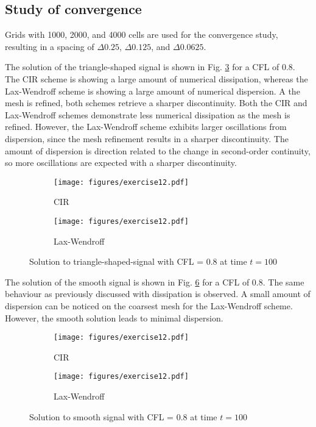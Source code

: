\documentclass[letterpaper,12pt,]{article}
\begin{document}
\subsection{Study of convergence}

Grids with 1000, 2000, and 4000 cells are used for the convergence study, resulting in a spacing of $\Delta 0.25$, $\Delta 0.125$, and $\Delta 0.0625$.

The solution of the triangle-shaped signal is shown in Fig. \ref{fig:e121} for a CFL of 0.8.
The CIR scheme is showing a large amount of numerical dissipation, whereas the Lax-Wendroff scheme is showing a large amount of numerical dispersion.
A the mesh is refined, both schemes retrieve a sharper discontinuity.
Both the CIR and Lax-Wendroff schemes demonstrate less numerical dissipation as the mesh is refined.
However, the Lax-Wendroff scheme exhibits larger oscillations from dispersion, since the mesh refinement results in a sharper discontinuity.
The amount of dispersion is direction related to the change in second-order continuity, so more oscillations are expected with a sharper discontinuity.

\begin{figure}[htb]%
  \centering%
  \begin{subfigure}[b]{0.49\textwidth}
    \texttt{[image: figures/exercise12.pdf]}
    \caption{CIR}
    \label{fig:cirt}
  \end{subfigure}
  \begin{subfigure}[b]{0.49\textwidth}
    \texttt{[image: figures/exercise12.pdf]}
    \caption{Lax-Wendroff}
    \label{fig:lwt}
  \end{subfigure}
\caption{Solution to triangle-shaped-signal with CFL = 0.8 at time $t = 100$}
\label{fig:e121}
\end{figure}

The solution of the smooth signal is shown in Fig. \ref{fig:e122} for a CFL of 0.8.
The same behaviour as previously discussed with dissipation is observed.
A small amount of dispersion can be noticed on the coarsest mesh for the Lax-Wendroff scheme.
However, the smooth solution leads to minimal dispersion.

\begin{figure}[htb]%
  \centering%
  \begin{subfigure}[b]{0.49\textwidth}
    \texttt{[image: figures/exercise12.pdf]}
    \caption{CIR}
    \label{fig:cirs}
  \end{subfigure}
  \begin{subfigure}[b]{0.49\textwidth}
    \texttt{[image: figures/exercise12.pdf]}
    \caption{Lax-Wendroff}
    \label{fig:lws}
  \end{subfigure}
\caption{Solution to smooth signal with CFL = 0.8 at time $t = 100$}
\label{fig:e122}
\end{figure}
\end{document}
